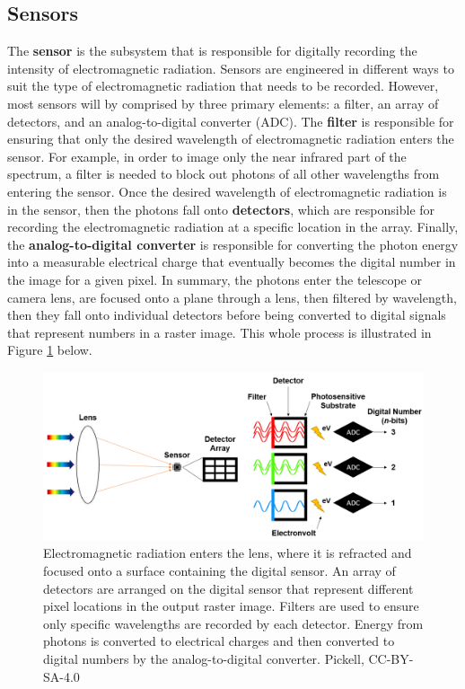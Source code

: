 \documentclass[
]{book}
\begin{document}
\subsection{Sensors}\label{sensors}

The \textbf{sensor} is the subsystem that is responsible for digitally recording the intensity of electromagnetic radiation. Sensors are engineered in different ways to suit the type of electromagnetic radiation that needs to be recorded. However, most sensors will by comprised by three primary elements: a filter, an array of detectors, and an analog-to-digital converter (ADC). The \textbf{filter} is responsible for ensuring that only the desired wavelength of electromagnetic radiation enters the sensor. For example, in order to image only the near infrared part of the spectrum, a filter is needed to block out photons of all other wavelengths from entering the sensor. Once the desired wavelength of electromagnetic radiation is in the sensor, then the photons fall onto \textbf{detectors}, which are responsible for recording the electromagnetic radiation at a specific location in the array. Finally, the \textbf{analog-to-digital converter} is responsible for converting the photon energy into a measurable electrical charge that eventually becomes the digital number in the image for a given pixel. In summary, the photons enter the telescope or camera lens, are focused onto a plane through a lens, then filtered by wavelength, then they fall onto individual detectors before being converted to digital signals that represent numbers in a raster image. This whole process is illustrated in Figure \ref{fig:12-lens-sensor-filter-detector-ADC} below.

\begin{figure}
\includegraphics[width=0.9\linewidth]{images/12-lens-sensor-filter-detector-ADC} \caption{Electromagnetic radiation enters the lens, where it is refracted and focused onto a surface containing the digital sensor. An array of detectors are arranged on the digital sensor that represent different pixel locations in the output raster image. Filters are used to ensure only specific wavelengths are recorded by each detector. Energy from photons is converted to electrical charges and then converted to digital numbers by the analog-to-digital converter. Pickell, CC-BY-SA-4.0}\label{fig:12-lens-sensor-filter-detector-ADC}
\end{figure}
\end{document}
